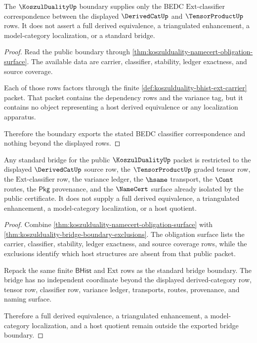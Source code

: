 \begin{theorem}
\label{thm:koszulduality-bridge-boundary-exclusions}
The $\KoszulDualityUp$ boundary supplies only the BEDC
$\mathrm{Ext}$-classifier correspondence between the displayed
$\DerivedCatUp$ and $\TensorProductUp$ rows. It does not assert a full derived
equivalence, a triangulated enhancement, a model-category localization, or a
standard bridge.
\end{theorem}
\begin{proof}
Read the public boundary through
\autoref{thm:koszulduality-namecert-obligation-surface}. The available data
are carrier, classifier, stability, ledger exactness, and source coverage.

Each of those rows factors through the finite
\autoref{def:koszulduality-bhist-ext-carrier} packet. That packet contains the
dependency rows and the variance tag, but it contains no object representing a
host derived equivalence or any localization apparatus.

Therefore the boundary exports the stated BEDC classifier correspondence and
nothing beyond the displayed rows.
\end{proof}

\begin{theorem}
\label{thm:koszulduality-standard-derived-tensor-bridge}
Any standard bridge for the public $\KoszulDualityUp$ packet is restricted to
the displayed $\DerivedCatUp$ source row, the $\TensorProductUp$ graded tensor
row, the $\mathrm{Ext}$-classifier row, the variance ledger, the $\hsame$
transport, the $\Cont$ routes, the $\mathsf{Pkg}$ provenance, and the
$\NameCert$ surface already isolated by the public certificate. It does not
supply a full derived equivalence, a triangulated enhancement, a
model-category localization, or a host quotient.
\end{theorem}
\begin{proof}
Combine \autoref{thm:koszulduality-namecert-obligation-surface} with
\autoref{thm:koszulduality-bridge-boundary-exclusions}. The obligation surface
lists the carrier, classifier, stability, ledger exactness, and source coverage
rows, while the exclusions identify which host structures are absent from that
public packet.

Repack the same finite $\mathsf{BHist}$ and $\mathrm{Ext}$ rows as the standard
bridge boundary. The bridge has no independent coordinate beyond the displayed
derived-category row, tensor row, classifier row, variance ledger, transports,
routes, provenance, and naming surface.

Therefore a full derived equivalence, a triangulated enhancement, a
model-category localization, and a host quotient remain outside the exported
bridge boundary.
\end{proof}

